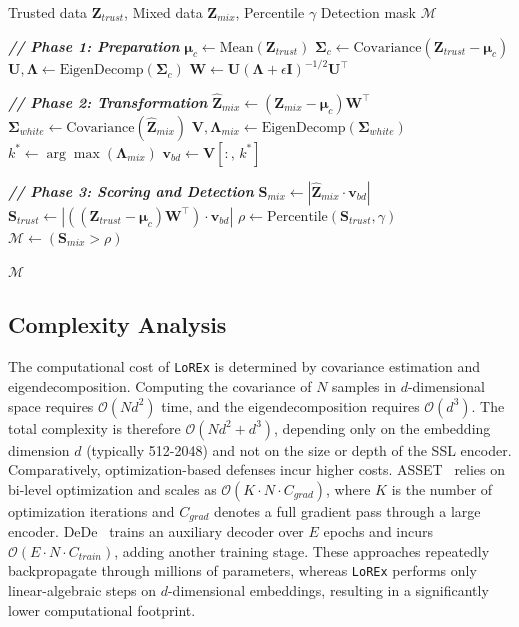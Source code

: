 \documentclass[letterpaper,twocolumn,10pt]{article}
\begin{document}
\begin{algorithm}[t]
\caption{\texttt{LoREx}: Whitening-based backdoor detection.}
\label{alg:lorex}
\begin{algorithmic}[1]
\Require Trusted data $\mathbf{Z}_{trust}$, Mixed data $\mathbf{Z}_{mix}$, Percentile $\gamma$
\Ensure Detection mask $\mathcal{M}$

\State \textbf{\textit{// Phase 1: Preparation}}
\State $\bm{\mu}_c \gets \text{Mean}(\mathbf{Z}_{trust})$
\State $\bm{\Sigma}_c \gets \text{Covariance}(\mathbf{Z}_{trust} - \bm{\mu}_c)$
\State $\mathbf{U}, \bm{\Lambda} \gets \text{EigenDecomp}(\bm{\Sigma}_c)$
\State $\mathbf{W} \gets \mathbf{U}(\bm{\Lambda} + \epsilon \mathbf{I})^{-1/2} \mathbf{U}^\top$

\State \textbf{\textit{// Phase 2: Transformation}}
\State $\mathbf{\hat{Z}}_{mix} \gets (\mathbf{Z}_{mix} - \bm{\mu}_c) \mathbf{W}^\top$
\State $\bm{\Sigma}_{white} \gets \text{Covariance}(\mathbf{\hat{Z}}_{mix})$
\State $\mathbf{V}, \bm{\Lambda}_{mix} \gets \text{EigenDecomp}(\bm{\Sigma}_{white})$
\State $k^* \gets \arg\max(\bm{\Lambda}_{mix})$
\State $\mathbf{v}_{bd} \gets \mathbf{V}[:,\, k^*]$

\State \textbf{\textit{// Phase 3: Scoring and Detection}}
\State $\mathbf{S}_{mix} \gets | \mathbf{\hat{Z}}_{mix} \cdot \mathbf{v}_{bd} |$
\State $\mathbf{S}_{trust} \gets | ((\mathbf{Z}_{trust} - \bm{\mu}_c) \mathbf{W}^\top) \cdot \mathbf{v}_{bd} |$
\State $\rho \gets \text{Percentile}(\mathbf{S}_{trust}, \gamma)$
\State $\mathcal{M} \gets (\mathbf{S}_{mix} > \rho)$

\Return $\mathcal{M}$
\end{algorithmic}
\end{algorithm}

 

\subsection{Complexity Analysis}
\label{complexity_analysis}

The computational cost of \texttt{LoREx} is determined by covariance estimation and eigendecomposition. Computing the covariance of $N$ samples in $d$-dimensional space requires $\mathcal{O}(N d^2)$ time, and the eigendecomposition requires $\mathcal{O}(d^3)$. The total complexity is therefore $\mathcal{O}(N d^2 + d^3)$, depending only on the embedding dimension $d$ (typically 512-2048) and not on the size or depth of the SSL encoder. Comparatively, optimization-based defenses incur higher costs. ASSET~\cite{asset} relies on bi-level optimization and scales as $\mathcal{O}(K \cdot N \cdot C_{grad})$, where $K$ is the number of optimization iterations and $C_{grad}$ denotes a full gradient pass through a large encoder. DeDe~\cite{hou2025dede} trains an auxiliary decoder over $E$ epochs and incurs $\mathcal{O}(E \cdot N \cdot C_{train})$, adding another training stage. These approaches repeatedly backpropagate through millions of parameters, whereas \texttt{LoREx} performs only linear-algebraic steps on $d$-dimensional embeddings, resulting in a significantly lower computational footprint.
\end{document}
